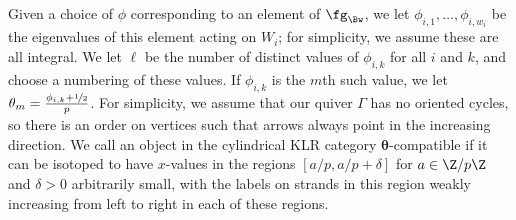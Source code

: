 Given a choice of $\phi$ corresponding to an element of $\fg_{\Bw}$, we let $\phi_{i,1},\dots, \phi_{i,w_i}$ be the eigenvalues of this element acting on $W_i$; for simplicity, we assume these are all integral.  We let $\ell$ be the number of distinct values of $\phi_{i,k}$ for all $i$ and $k$, and choose a numbering of these values. If $\phi_{i,k}$ is the $m$th such value,  we let $\theta_m=\frac{\phi_{i,k}+\nicefrac{1}{2}}{p}$. For simplicity, we assume that our quiver $\Gamma$ has no oriented cycles, so there is an order on vertices such that arrows always point in the increasing direction.  We call an object in the cylindrical KLR category $\boldsymbol{\theta}$-compatible if it can be isotoped to have $x$-values in the regions $[a/p,a/p+\delta]$ for $a\in \Z/p\Z$ and $\delta>0$ arbitrarily small, with the labels on strands in this region weakly increasing from left to right in each of these regions. 

